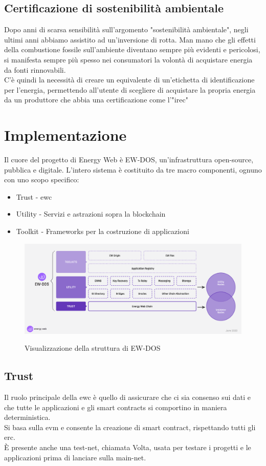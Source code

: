 \documentclass[12pt, letterpaper, twoside]{article}
\begin{document}
\subsection{Certificazione di sostenibilità ambientale}
Dopo anni di scarsa sensibilità sull'argomento "sostenibilità ambientale", negli ultimi anni abbiamo assistito ad un'inversione di rotta.
Man mano che gli effetti della combustione fossile sull'ambiente diventano sempre più evidenti e pericolosi, si manifesta sempre più spesso nei consumatori la volontà di acquistare energia da fonti rinnovabili.\\
C'è quindi la necessità di creare un equivalente di un'etichetta di identificazione per l'energia, permettendo all'utente di scegliere di acquistare la propria energia da un produttore che abbia una certificazione come l'"\gls{irec}"

\newpage

\section{Implementazione}
Il cuore del progetto di Energy Web è EW-DOS, un'infrastruttura open-source, pubblica e digitale.
L'intero sistema è costituito da tre macro componenti, ognuno con uno scopo specifico:
\begin{itemize}
    \item Trust - \gls{ewc}
    \item Utility - Servizi e astrazioni sopra la blockchain
    \item Toolkit - Frameworks per la costruzione di applicazioni
\end{itemize}

\begin{figure}[h]
    \includegraphics[width=13cm]{ew-dos.png}
    \centering
    \label{ew-dos}
    \caption{Visualizzazione della struttura di EW-DOS \cite{img:ew-dos}}
\end{figure}

\subsection{Trust}
Il ruolo principale della \gls{ewc} è quello di assicurare che ci sia consenso sui dati e che tutte le applicazioni e gli smart contracts si comportino in maniera deterministica.\\
Si basa sulla \gls{evm} e consente la creazione di smart contract, rispettando tutti gli \gls{erc}.\\
È presente anche una test-net, chiamata Volta, usata per testare i progetti e le applicazioni prima di lanciare sulla main-net.
\end{document}
